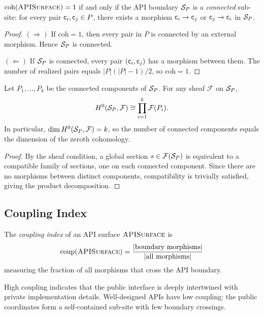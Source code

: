 \documentclass[11pt]{article}
\newcommand{\APISurface}{\textsc{APISurface}}
\newcommand{\CohIndex}{\mathrm{coh}}
\newcommand{\CoupIndex}{\mathrm{coup}}
\begin{document}
\begin{theorem}\label{thm:coh-conn}
$\CohIndex(\APISurface) = 1$ if and only if the API boundary $\mathcal{S}_P$
is a \emph{connected} sub-site: for every pair $\mathsf{c}_i, \mathsf{c}_j \in P$,
there exists a morphism $\mathsf{c}_i \to \mathsf{c}_j$ or $\mathsf{c}_j \to \mathsf{c}_i$
in $\mathcal{S}_P$.
\end{theorem}

\begin{proof}
$(\Rightarrow)$ If $\CohIndex = 1$, then every pair in $P$ is connected
by an external morphism.  Hence $\mathcal{S}_P$ is connected.

$(\Leftarrow)$ If $\mathcal{S}_P$ is connected, every pair $(\mathsf{c}_i, \mathsf{c}_j)$
has a morphism between them.  The number of realized pairs equals
$|P|(|P|-1)/2$, so $\CohIndex = 1$.
\end{proof}

\begin{proposition}[$H^0$ Decomposition]\label{prop:h0-decomp}
Let $P_1, \ldots, P_k$ be the connected components of $\mathcal{S}_P$.  For any
sheaf $\mathcal{F}$ on $\mathcal{S}_P$,
\[
  H^{0}(\mathcal{S}_P, \mathcal{F}) \cong \prod_{i=1}^{k} \mathcal{F}(P_i).
\]
In particular, $\dim H^{0}(\mathcal{S}_P, \mathcal{F}) = k$, so the number of
connected components equals the dimension of the zeroth cohomology.
\end{proposition}

\begin{proof}
By the sheaf condition, a global section $s \in \mathcal{F}(\mathcal{S}_P)$ is
equivalent to a compatible family of sections, one on each connected
component.  Since there are no morphisms between distinct components,
compatibility is trivially satisfied, giving the product decomposition.
\end{proof}

\subsection{Coupling Index}

\begin{definition}\label{def:coupling}
The \emph{coupling index} of an API surface $\APISurface$ is
\[
  \CoupIndex(\APISurface) = \frac{|\text{boundary morphisms}|}{|\text{all morphisms}|}
\]
measuring the fraction of all morphisms that cross the API boundary.
\end{definition}

High coupling indicates that the public interface is deeply intertwined
with private implementation details.  Well-designed APIs have low coupling:
the public coordinates form a self-contained sub-site with few boundary
crossings.
\end{document}
